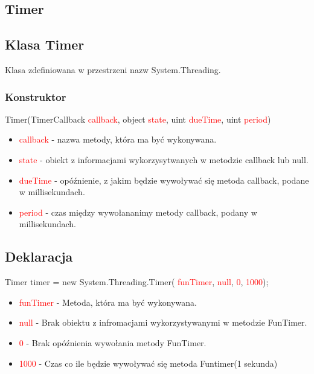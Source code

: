\documentclass{article}
\begin{document}
\subsection{Timer}
\subsection{Klasa Timer}
Klasa zdefiniowana w przestrzeni nazw System.Threading.
\subsubsection{Konstruktor}
Timer(TimerCallback \textcolor{red}{callback}, object \textcolor{red}{state}, uint \textcolor{red}{dueTime}, uint \textcolor{red}{period})
\begin{itemize}
\item \textcolor{red}{callback} - nazwa metody, która ma być wykonywana.
\item \textcolor{red}{state} - obiekt z informacjami wykorzysytwanych w metodzie callback lub null.
\item \textcolor{red}{dueTime} - opóźnienie, z jakim będzie wywoływać się metoda callback, podane w millisekundach.
\item \textcolor{red}{period} - czas między wywołananimy metody callback, podany w millisekundach.
\end{itemize}
\subsection{Deklaracja}
Timer timer = new System.Threading.Timer(\space \textcolor{red}{ funTimer},\space \textcolor{red}{ null},\space \textcolor{red}{ 0},\space \textcolor{red}{ 1000});
\begin{itemize}
\item \textcolor{red}{funTimer} - Metoda, która ma być wykonywana.
\item \textcolor{red}{null} - Brak obiektu z infromacjami wykorzystywanymi w metodzie FunTimer.
\item \textcolor{red}{0} - Brak opóźnienia wywołania metody FunTimer.
\item \textcolor{red}{1000} - Czas co ile będzie wywoływać się metoda Funtimer(1 sekunda)
\end{itemize}
\end{document}
